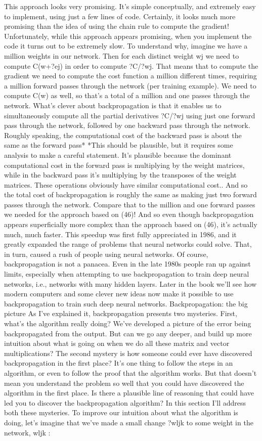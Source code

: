 $$This approach looks very promising. It's simple conceptually, and extremely easy to implement, using just a few lines of code. Certainly, it looks much more promising than the idea of using the chain rule to compute the gradient!
Unfortunately, while this approach appears promising, when you implement the code it turns out to be extremely slow. To understand why, imagine we have a million weights in our network. Then for each distinct weight wj
we need to compute C(w+?ej) in order to compute ?C/?wj. That means that to compute the gradient we need to compute the cost function a million different times, requiring a million forward passes through the network (per training example). We need to compute C(w)
as well, so that's a total of a million and one passes through the network.
What's clever about backpropagation is that it enables us to simultaneously compute all the partial derivatives ?C/?wj
using just one forward pass through the network, followed by one backward pass through the network. Roughly speaking, the computational cost of the backward pass is about the same as the forward pass* *This should be plausible, but it requires some analysis to make a careful statement. It's plausible because the dominant computational cost in the forward pass is multiplying by the weight matrices, while in the backward pass it's multiplying by the transposes of the weight matrices. These operations obviously have similar computational cost.. And so the total cost of backpropagation is roughly the same as making just two forward passes through the network. Compare that to the million and one forward passes we needed for the approach based on (46)! And so even though backpropagation appears superficially more complex than the approach based on (46), it's actually much, much faster.
This speedup was first fully appreciated in 1986, and it greatly expanded the range of problems that neural networks could solve. That, in turn, caused a rush of people using neural networks. Of course, backpropagation is not a panacea. Even in the late 1980s people ran up against limits, especially when attempting to use backpropagation to train deep neural networks, i.e., networks with many hidden layers. Later in the book we'll see how modern computers and some clever new ideas now make it possible to use backpropagation to train such deep neural networks.
Backpropagation: the big picture
As I've explained it, backpropagation presents two mysteries. First, what's the algorithm really doing? We've developed a picture of the error being backpropagated from the output. But can we go any deeper, and build up more intuition about what is going on when we do all these matrix and vector multiplications? The second mystery is how someone could ever have discovered backpropagation in the first place? It's one thing to follow the steps in an algorithm, or even to follow the proof that the algorithm works. But that doesn't mean you understand the problem so well that you could have discovered the algorithm in the first place. Is there a plausible line of reasoning that could have led you to discover the backpropagation algorithm? In this section I'll address both these mysteries.
To improve our intuition about what the algorithm is doing, let's imagine that we've made a small change ?wljk
to some weight in the network, wljk
: 

